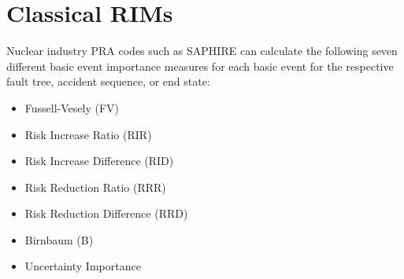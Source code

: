 \section{Classical RIMs}
\label{sec:classicalRIMs}

% 
% 

Nuclear industry PRA codes such as SAPHIRE can calculate the following seven different basic event importance 
measures for each basic event for the respective fault tree, accident sequence, or end state:
\begin{itemize}
  \item Fussell-Vesely (FV)
  \item Risk Increase Ratio (RIR)
  \item Risk Increase Difference (RID)
  \item Risk Reduction Ratio (RRR)
  \item Risk Reduction Difference (RRD)
  \item Birnbaum (B)
  \item Uncertainty Importance
\end{itemize}   
  
